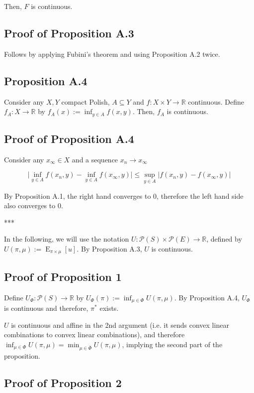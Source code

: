 \documentclass[a4paper]{article}
\DeclareMathOperator{\E}{E}
\newcommand{\Reals}{\mathbb{R}}
\newcommand{\Abs}[1]{\lvert #1 \rvert}
\newcommand{\Prob}{\mathcal{P}}
\begin{document}
Then, ${F}$ is continuous.

\subsection{Proof of Proposition A.3}

Follows by applying Fubini's theorem and using Proposition A.2 twice.

\subsection{Proposition A.4}

Consider any ${X,Y}$ compact Polish, ${A \subseteq Y}$ and ${f: X \times Y \rightarrow \Reals}$ continuous. Define ${f_A: X \rightarrow \Reals}$ by ${f_A(x):= \inf_{y \in A} f(x,y)}$. Then, ${f_A}$ is continuous.

\subsection{Proof of Proposition A.4}

Consider any ${x_\infty \in X}$ and a sequence ${x_n \rightarrow x_\infty}$

$$\Abs{\inf_{y \in A} f(x_n,y) - \inf_{y \in A} f(x_\infty,y)} \leq \sup_{y \in A} \Abs{f(x_n,y) - f(x_\infty,y)}$$

By Proposition A.1, the right hand converges to 0, therefore the left hand side also converges to 0.

***

In the following, we will use the notation ${U: \Prob(S) \times \Prob(E) \rightarrow \Reals}$, defined by ${U(\pi,\mu):=\E_{\pi \times \mu}[u]}$. By Proposition A.3, ${U}$ is continuous. 

\subsection{Proof of Proposition 1}

Define ${U_\Phi: \Prob(S) \rightarrow \Reals}$ by ${U_\Phi(\pi):= \inf_{\mu \in \Phi} U(\pi,\mu)}$. By Proposition A.4, ${U_{\Phi}}$ is continuous and therefore, ${\pi^*}$ exists.

${U}$ is continuous and affine in the 2nd argument (i.e. it sends convex linear combinations to convex linear combinations), and therefore ${\inf_{\mu \in \Phi} U(\pi,\mu)=\min_{\mu \in \bar{\Phi}} U(\pi,\mu)}$, implying the second part of the proposition.

\subsection{Proof of Proposition 2}
\end{document}
